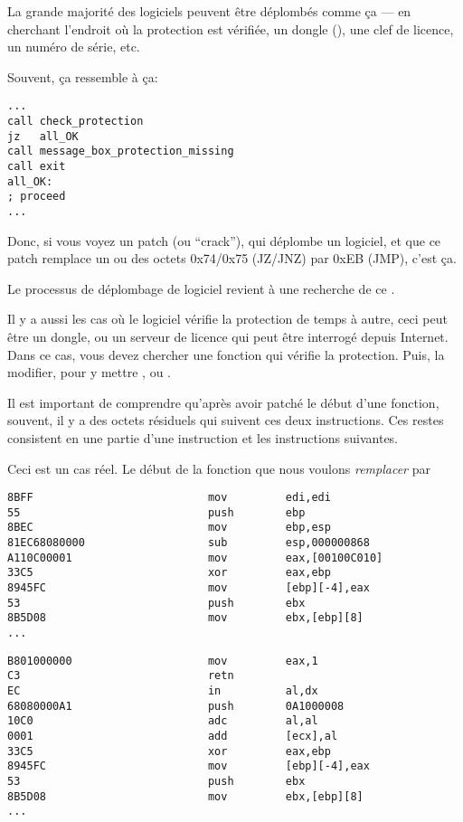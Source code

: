 \myindex{\SoftwareCracking}

La grande majorité des logiciels peuvent être déplombés comme ça --- en cherchant
l'endroit où la protection est vérifiée, un dongle (), une clef de
licence, un numéro de série, etc.

Souvent, ça ressemble à ça:

\begin{lstlisting}[style=customasmx86]
...
call check_protection
jz   all_OK
call message_box_protection_missing
call exit
all_OK:
; proceed
...
\end{lstlisting}

Donc, si vous voyez un patch (ou ``crack''), qui déplombe un logiciel, et que ce
patch remplace un ou des octets 0x74/0x75 (JZ/JNZ) par 0xEB (JMP), c'est ça.

Le processus de déplombage de logiciel revient à une recherche de ce .

\myhrule{}

Il y a aussi les cas où le logiciel vérifie la protection de temps à autre, ceci
peut être un dongle, ou un serveur de licence qui peut être interrogé depuis Internet.
Dans ce cas, vous devez chercher une fonction qui vérifie la protection.
Puis, la modifier, pour y mettre , ou .

Il est important de comprendre qu'après avoir patché le début d'une fonction,
souvent, il y a des octets résiduels qui suivent ces deux instructions.
Ces restes consistent en une partie d'une instruction et les instructions suivantes.

Ceci est un cas réel.
Le début de la fonction que nous voulons \emph{remplacer} par 

\begin{lstlisting}[style=customasmx86,caption=Before]
8BFF                           mov         edi,edi
55                             push        ebp
8BEC                           mov         ebp,esp
81EC68080000                   sub         esp,000000868
A110C00001                     mov         eax,[00100C010]
33C5                           xor         eax,ebp
8945FC                         mov         [ebp][-4],eax
53                             push        ebx
8B5D08                         mov         ebx,[ebp][8]
...
\end{lstlisting}

\begin{lstlisting}[style=customasmx86,caption=After]
B801000000                     mov         eax,1
C3                             retn
EC                             in          al,dx
68080000A1                     push        0A1000008
10C0                           adc         al,al
0001                           add         [ecx],al
33C5                           xor         eax,ebp
8945FC                         mov         [ebp][-4],eax
53                             push        ebx
8B5D08                         mov         ebx,[ebp][8]
...
\end{lstlisting}

